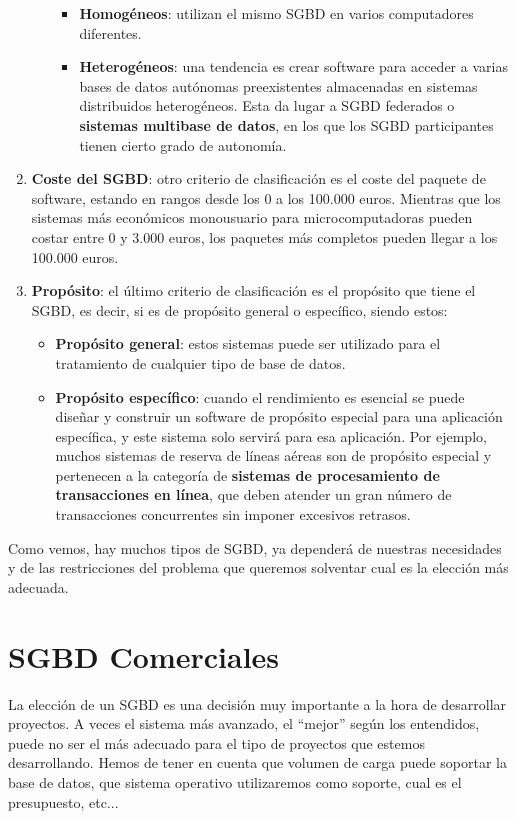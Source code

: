 \begin{enumerate}[label=(\alph*)]
\begin{itemize}
        \begin{itemize}
            \item \textbf{Homogéneos}: utilizan el mismo SGBD en varios computadores diferentes.

            \item \textbf{Heterogéneos}: una tendencia es crear software para acceder a varias bases de datos autónomas preexistentes almacenadas en sistemas distribuidos heterogéneos. Esta da lugar a SGBD federados o \textbf{sistemas multibase de datos}, en los que los SGBD participantes tienen cierto grado de autonomía.
        \end{itemize}
    \end{itemize}

    \item \textbf{Coste del SGBD}: otro criterio de clasificación es el coste del paquete de software, estando en rangos desde los 0 a los 100.000 euros. Mientras que los sistemas más económicos monousuario para microcomputadoras pueden costar entre 0 y 3.000 euros, los paquetes más completos pueden llegar a los 100.000 euros.

    \item \textbf{Propósito}: el último criterio de clasificación es el propósito que tiene el SGBD, es decir, si es de propósito general o específico, siendo estos:

    \begin{itemize}
        \item \textbf{Propósito general}: estos sistemas puede ser utilizado para el tratamiento de cualquier tipo de base de datos.

        \item \textbf{Propósito específico}: cuando el rendimiento es esencial se puede diseñar y construir un software de propósito especial para una aplicación específica, y este sistema solo servirá para esa aplicación. Por ejemplo, muchos sistemas de reserva de líneas aéreas son de propósito especial y pertenecen a la categoría de \textbf{sistemas de procesamiento de transacciones en línea}, que deben atender un gran número de transacciones concurrentes sin imponer excesivos retrasos.
    \end{itemize}
\end{enumerate}

Como vemos, hay muchos tipos de SGBD, ya dependerá de nuestras necesidades y de las restricciones del problema que queremos solventar cual es la elección más adecuada.

\section{SGBD Comerciales}
La elección de un SGBD es una decisión muy importante a la hora de desarrollar proyectos. A veces el sistema más avanzado, el ``mejor'' según los entendidos, puede no ser el más adecuado para el tipo de proyectos que estemos desarrollando. Hemos de tener en cuenta que volumen de carga puede soportar la base de datos, que sistema operativo utilizaremos como soporte, cual es el presupuesto, etc...

